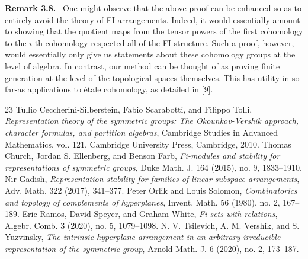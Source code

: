 \documentclass[10pt,a4paper]{article}
\newenvironment{sourceblockroman}[1]{\par\medskip\noindent\textbf{#1.}\ }{\par\medskip}
\begin{document}
\begin{sourceblockroman}{Remark 3.8}
One might observe that the above proof can be enhanced so-as to entirely avoid the theory of FI-arrangements. Indeed, it would essentially amount to showing that the quotient maps from the tensor powers of the first cohomology to the $i$-th cohomology respected all of the FI-structure. Such a proof, however, would essentially only give us statements about these cohomology groups at the level of algebra. In contrast, our method can be thought of as proving finite generation at the level of the topological spaces themselves. This has utility in-so-far-as applications to \'etale cohomology, as detailed in [9].
\end{sourceblockroman}

\begin{thebibliography}{23}
 Tullio Ceccherini-Silberstein, Fabio Scarabotti, and Filippo Tolli, \emph{Representation theory of the symmetric groups: The Okounkov-Vershik approach, character formulas, and partition algebras}, Cambridge Studies in Advanced Mathematics, vol. 121, Cambridge University Press, Cambridge, 2010.
 Thomas Church, Jordan S. Ellenberg, and Benson Farb, \emph{Fi-modules and stability for representations of symmetric groups}, Duke Math. J. 164 (2015), no. 9, 1833--1910.
 Nir Gadish, \emph{Representation stability for families of linear subspace arrangements}, Adv. Math. 322 (2017), 341--377.
 Peter Orlik and Louis Solomon, \emph{Combinatorics and topology of complements of hyperplanes}, Invent. Math. 56 (1980), no. 2, 167--189.
 Eric Ramos, David Speyer, and Graham White, \emph{Fi-sets with relations}, Algebr. Comb. 3 (2020), no. 5, 1079--1098.
 N. V. Tsilevich, A. M. Vershik, and S. Yuzvinsky, \emph{The intrinsic hyperplane arrangement in an arbitrary irreducible representation of the symmetric group}, Arnold Math. J. 6 (2020), no. 2, 173--187.
\end{thebibliography}
\end{document}
